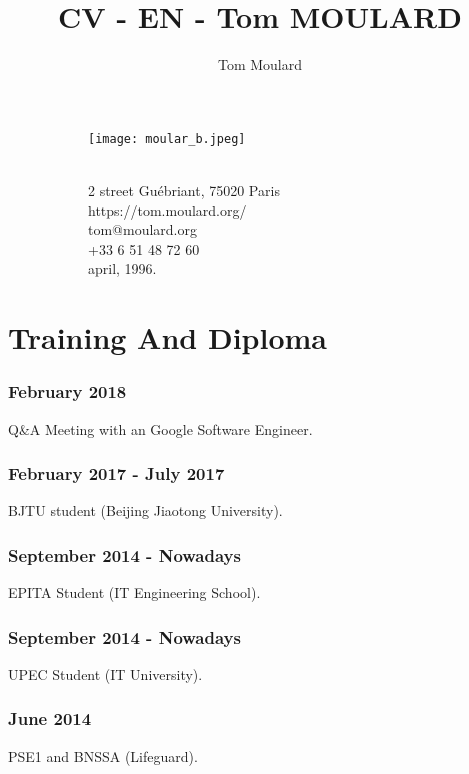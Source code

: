 \documentclass{article}
\begin{document}
    \title{CV - EN - Tom MOULARD}
    \author{Tom Moulard}

    \begin{center}
        \begin{figure}
            \centering
            \begin{subfigure}[b]{0.3\textwidth}
                \texttt{[image: moular\_b.jpeg]}
            \end{subfigure}
            \begin{subfigure}[b]{0.3\textwidth}
                {\huge\bfseries\theauthor}\\
                \vspace{.25em}
                2 street Gu\'ebriant, 75020 Paris\\
                https://tom.moulard.org/\\
                tom@moulard.org\\
                +33 6 51 48 72 60\\
                april,  1996.
            \end{subfigure}
        \end{figure}
    \end{center}

    \section{Training And Diploma}
        \subsubsection{February 2018}
            Q{\&}A Meeting with an Google Software Engineer.
        \subsubsection{February 2017 - July 2017}
            BJTU student (Beijing Jiaotong University).
        \subsubsection{September 2014 - Nowadays}
            EPITA Student (IT Engineering School).
        \subsubsection{September 2014 - Nowadays}
            UPEC Student (IT University).
        \subsubsection{June 2014}
            PSE1 and BNSSA (Lifeguard).
\end{document}
